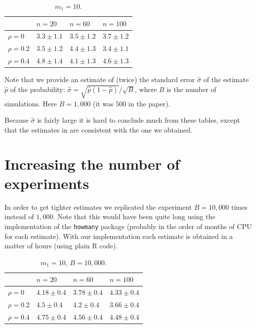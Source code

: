 \documentclass{article}
\begin{document}
\begin{table}[ht]
\centering
\begin{tabular}{llll}
  \hline
 & $n=20$ & $n=60$ & $n=100$ \\ 
  \hline
$\rho=0$ & $3.3\pm1.1$ & $3.5\pm1.2$ & $3.7\pm1.2$ \\ 
  $\rho=0.2$ & $3.5\pm1.2$ & $4.4\pm1.3$ & $3.4\pm1.1$ \\ 
  $\rho=0.4$ & $4.8\pm1.4$ & $4.1\pm1.3$ & $4.6\pm1.3$ \\ 
   \hline
\end{tabular}
\caption{$m_1=10$.} 
\label{tab:10-3}
\end{table}
Note that we provide an estimate of (twice) the standard error $\hat{\sigma}$ of the estimate $\hat{p}$ of the probability: $\hat{\sigma} =\sqrt{\hat{p}(1-\hat{p})}/\sqrt{B}$, where $B$ is the number of simulations.  Here $B=1,000$ (it was $500$ in the paper). 

Because $\hat{\sigma}$ is fairly large it is hard to conclude much from these tables, except that the estimates in \cite[Table 1]{meinshausen06false} are consistent with the one we obtained. 

\section{Increasing the number of experiments}
In order to get tighter estimates we replicated the experiment $B=10,000$ times instead of $1,000$. Note that this would have been quite long using the implementation of the \texttt{howmany} package (probably in the order of months of CPU for each estimate).  With our implementation each estimate is obtained in a matter of hours (using plain R code). 

\begin{table}[ht]
\centering
\begin{tabular}{llll}
  \hline
 & $n=20$ & $n=60$ & $n=100$ \\ 
  \hline
$\rho=0$ & $4.18\pm0.4$ & $3.78\pm0.4$ & $4.33\pm0.4$ \\ 
  $\rho=0.2$ & $4.5\pm0.4$ & $4.2\pm0.4$ & $3.66\pm0.4$ \\ 
  $\rho=0.4$ & $4.75\pm0.4$ & $4.56\pm0.4$ & $4.48\pm0.4$ \\ 
   \hline
\end{tabular}
\caption{$m_1=10$, $B=10,000$.} 
\label{tab:10-4}
\end{table}
\end{document}
